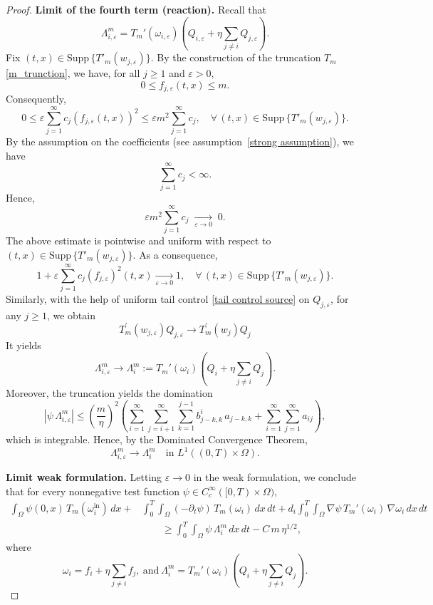 \documentclass[10pt,a4paper]{amsart}
\begin{document}
\begin{proof}
		\medskip
		\noindent\textbf{Limit of the fourth term (reaction).}
		Recall that
		\[
		\Lambda^m_{i,\varepsilon}
		=
		T_m'(\omega_{i,\varepsilon})
		\left(
		Q_{i,\varepsilon}
		+
		\eta \sum_{j\ne i} Q_{j,\varepsilon}
		\right).
		\]
		Fix $(t,x)\in \text{Supp}\, \{ T'_m{(w_{j,\varepsilon})}\}$.  
		By the construction of the truncation $T_m$ \eqref{m_trunction}, we have, for all $j\ge1$ and
		$\varepsilon>0$,
		\[
		0 \le f_{j,\varepsilon}(t,x) \le m .
		\]
		Consequently, 
		\[
		0 \le \varepsilon\sum_{j=1}^{\infty} c_j (f_{j,\varepsilon}(t,x))^2
		\le
		\varepsilon m^2 \sum_{j=1}^{\infty} c_j, \quad \forall \, (t,x)\in \text{Supp}\, \{ T'_m{(w_{j,\varepsilon})}\}. 
		\]
		By the assumption on the coefficients (see assumption~\ref{strong assumption}), we have
		\[
		\sum_{j=1}^{\infty} c_j < \infty .
		\]
		Hence,
		\[
		\varepsilon m^2 \sum_{j=1}^{\infty} c_j
		\;\xrightarrow[\varepsilon\to0]{}\; 0 .
		\]
		The above estimate is pointwise and uniform with respect to $(t,x)\in \text{Supp}\, \{ T'_m{(w_{j,\varepsilon})}\}$.
		As a consequence,
		\[
		1+\varepsilon\sum_{j=1}^{\infty} c_j (f_{j,\varepsilon})^2(t,x)
		\xrightarrow[\varepsilon\to0]{}
		1,
		\quad \forall \, (t,x)\in \text{Supp}\, \{ T'_m{(w_{j,\varepsilon})}\} .
		\]
		Similarly, with the help of uniform tail control \eqref{tail control source} on $Q_{j,\varepsilon}$, for any $j\ge 1$, we obtain
		\[
		T_{m}^{'}(w_{j,\varepsilon})Q_{j,\varepsilon} \to T_m^{'}(w_j)Q_j
		\]
		It yields
		\[
		\Lambda^m_{i,\varepsilon} \to \Lambda^m_i
		:=
		T_m'(\omega_i)
		\left(
		Q_i + \eta \sum_{j\ne i} Q_j
		\right).
		\]
		Moreover, the truncation yields the domination
		\[
		|\psi\,\Lambda^m_{i,\varepsilon}|
		\le
		\left(\frac{m}{\eta}\right)^2
		\left(
		\sum_{i=1}^{\infty}\sum_{j=i+1}^{\infty}\sum_{k=1}^{j-1}
		b^i_{j-k,k}\,a_{j-k,k}
		+
		\sum_{i=1}^{\infty}\sum_{j=1}^{\infty} a_{ij}
		\right),
		\]
		which is integrable. Hence, by the Dominated Convergence Theorem,
		\[
		\Lambda^m_{i,\varepsilon} \to \Lambda^m_i
		\quad \text{in } L^1((0,T)\times\Omega).
		\]
		
		\medskip
		\noindent\textbf{Limit weak formulation.}
		Letting $\varepsilon\to0$ in the weak formulation, we conclude that for every
		nonnegative test function $\psi\in C_c^\infty([0,T)\times\Omega)$,
		\begin{align*}
			\int_{\Omega} \psi(0,x)\,T_m(\omega_i^{\mathrm{in}})\,dx
			+&
			\int_{0}^{T}\!\!\int_{\Omega}
			(-\partial_t\psi)\,T_m(\omega_i)\,dx\,dt
			+
			d_i \int_{0}^{T}\!\!\int_{\Omega}
			\nabla\psi\,
			T_m'(\omega_i)\,
			\nabla\omega_i\,dx\,dt
			\\
			&\qquad \ge
			\int_{0}^{T}\!\!\int_{\Omega}
			\psi\,\Lambda^m_i\,dx\,dt
			-
			C\,m\,\eta^{1/2},
		\end{align*}
		where
		\[
		\omega_i
		=
		f_i + \eta \sum_{j\ne i} f_j,
		\ \text{and} \
		\Lambda^m_i
		=
		T_m'(\omega_i)
		\left(
		Q_i + \eta \sum_{j\ne i} Q_j
		\right).
		\]
	\end{proof}
\end{document}
